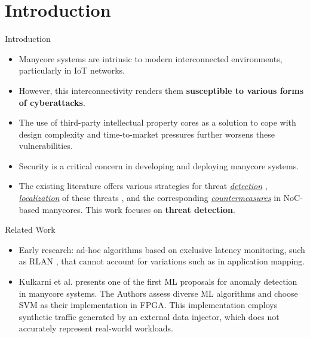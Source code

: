 \section{Introduction}

\begin{frame}{Introduction}
    \begin{itemize}
        \item Manycore systems are intrinsic to modern interconnected environments, particularly in IoT networks. 
        
        \item However, this interconnectivity renders them \textbf{susceptible to various forms of cyberattacks}.
        
        \item The use of third-party intellectual property cores as a solution to cope with design complexity and time-to-market pressures further worsens these vulnerabilities.
        
        \item Security is a critical concern in developing and deploying manycore systems.

        \item The existing literature offers various strategies for threat \ul{\textit{detection}} \cite{Charles:2021:Survey}, \ul{\textit{localization}} of these threats \cite{Subodha:2020:Localization}, and the corresponding \ul{\textit{countermeasures}} \cite{Faccenda:2021:Countermeasures} in NoC-based manycores. This work focuses on \textbf{threat detection}.  
    \end{itemize}
\end{frame}

\begin{frame}{Related Work}
    
    \begin{itemize}
    
    \item Early research: ad-hoc algorithms based on exclusive latency monitoring, such as RLAN \cite{Rajesh2015}, that cannot account for variations such as in application mapping.
    
    \item Kulkarni et al. \cite{Kulkarni:2016:SVM} presents one of the first ML proposals for anomaly detection in manycore systems. The Authors assess diverse ML algorithms and choose SVM as their implementation in FPGA. This implementation employs synthetic traffic generated by an external data injector, which does not accurately represent real-world workloads. 
                    
    \end{itemize}
\end{frame}

